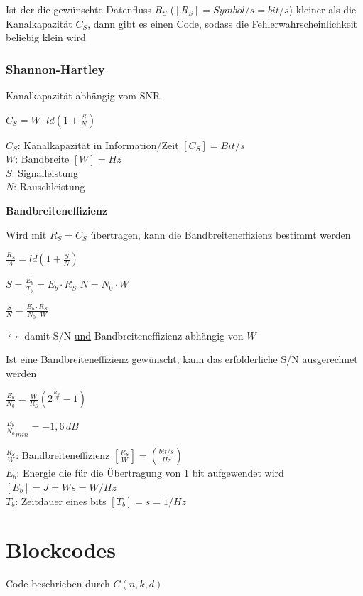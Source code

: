 Ist der die gewünschte Datenfluss $R_S$ ($[R_S] = Symbol/s = bit/s$) kleiner als die Kanalkapazität $C_S$, dann
gibt es einen Code, sodass die Fehlerwahrscheinlichkeit beliebig klein wird

\subsubsection{Shannon-Hartley}

Kanalkapazität abhängig vom SNR

$\displaystyle{
    C_S = W \cdot ld\left( 1 + \frac{S}{N} \right)
}$

$C_S$: Kanalkapazität in Information/Zeit $[C_S] = Bit/s$\\
$W$: Bandbreite $[W] = Hz$\\
$S$: Signalleistung\\
$N$: Rauschleistung

\textbf{Bandbreiteneffizienz}

Wird mit $R_S = C_S$ übertragen, kann die Bandbreiteneffizienz bestimmt werden

$\displaystyle{
    \frac{R_S}{W} = ld\left( 1 + \frac{S}{N} \right)
}$

$\displaystyle{
    S = \frac{E_b}{T_b} = E_b \cdot R_S
}$\;\;\;\;\;\;\;\;\;\;
$\displaystyle{
    N = N_0 \cdot W
}$

$\displaystyle{
    \frac{S}{N} = \frac{E_b \cdot R_S}{N_0 \cdot W}
}$

$\hookrightarrow$ damit S/N \underline{und} Bandbreiteneffizienz abhängig von $W$

Ist eine Bandbreiteneffizienz gewünscht, kann das erfolderliche S/N ausgerechnet werden

$\displaystyle{
    \frac{E_b}{N_0} = \frac{W}{R_S} \left( 2^{\frac{R_S}{W}} - 1 \right)
}$

$\displaystyle{
    \frac{E_b}{N_0}_{min} = -1,6\,dB
}$

$\frac{R_S}{W}$: Bandbreiteneffizienz $[\frac{R_S}{W}] = \left(\frac{bit/s}{Hz}\right)$\\
$E_b$: Energie die für die Übertragung von 1 bit aufgewendet wird $[E_b] = J = Ws = W/Hz$\\
$T_b$: Zeitdauer eines bits $[T_b] = s = 1/Hz$

\section{Blockcodes}

Code beschrieben durch $C(n, k, d)$

